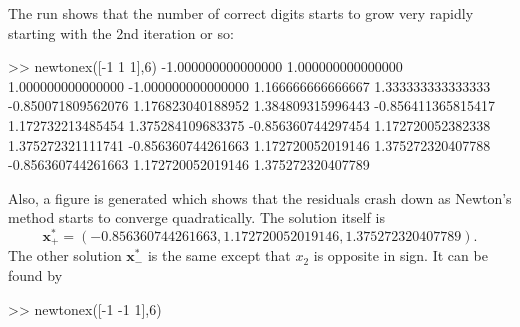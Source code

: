 \documentclass[11pt]{amsart}
\newcommand{\bx}{\mathbf{x}}
\begin{document}
The run shows that the number of correct digits starts to grow very rapidly starting with the 2nd iteration or so:
\begin{mVerb}
>> newtonex([-1 1 1],6)
-1.000000000000000   1.000000000000000   1.000000000000000
-1.000000000000000   1.166666666666667   1.333333333333333
-0.850071809562076   1.176823040188952   1.384809315996443
-0.856411365815417   1.172732213485454   1.375284109683375
-0.856360744297454   1.172720052382338   1.375272321111741
-0.856360744261663   1.172720052019146   1.375272320407788
-0.856360744261663   1.172720052019146   1.375272320407789
\end{mVerb}
Also, a figure is generated which shows that the residuals crash down as Newton's method starts to converge quadratically.  The solution itself is
    $$\bx_+^* = (-0.856360744261663, 1.172720052019146, 1.375272320407789).$$
The other solution $\bx_-^*$ is the same except that $x_2$ is opposite in sign.  It can be found by
\begin{mVerb}
>> newtonex([-1 -1 1],6)
\end{mVerb}

\end{document}

